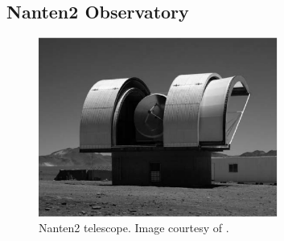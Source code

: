 \subsection{Nanten2 Observatory} \label{sec:NANTEN}

\begin{figure} [h]
    \centering
    \includegraphics[width=0.7\textwidth]{06_Interstellar_Medium/Images/Observatories/Nanten2.pdf}
    \caption{Nanten2 telescope. Image courtesy of \cite{2006IAUSS...1E..21F}.}
    \label{fig:interstellar_medium_NANTEN}
\end{figure}

